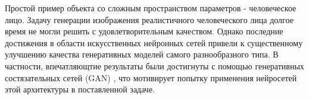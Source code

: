 	Простой пример объекта со сложным пространством параметров - человеческое лицо. Задачу генерации изображения реалистичного человеческого лица долгое время не могли решить с удовлетворительным качеством. Однако последние достижения в области искусственных нейронных сетей привели к существенному улучшению качества генеративных моделей самого разнообразного типа. В частности, впечатляющтие результаты были достигнуты с помощью генеративных состязательных сетей (GAN) \cite{cGAN, cGAN-face, EBGAN, BEGAN}, что мотивирует попытку применения нейросетей этой архитектуры в поставленной задаче.
